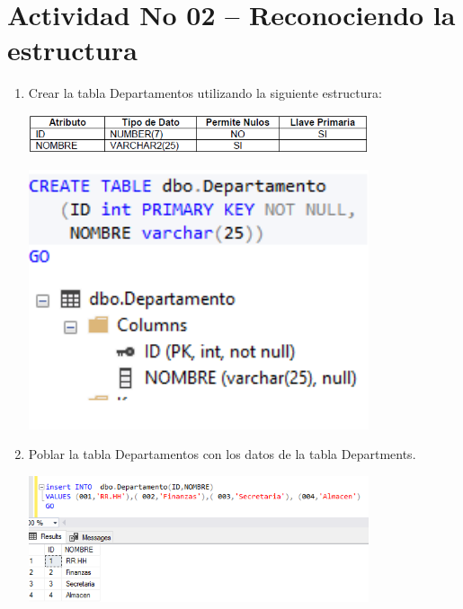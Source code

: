 \section{Actividad No 02 – Reconociendo la estructura} 

\begin{enumerate}[1.]
	\item Crear la tabla Departamentos utilizando la siguiente estructura:
	\\
		\begin{center}
		\includegraphics[width=10cm]{./Imagenes/enun1} 
		\end{center}
	
		\begin{center}
		\includegraphics[width=10cm]{./Imagenes/eje1} 
		\end{center}
	
	\item Poblar la tabla Departamentos con los datos de la tabla Departments.
	\\
	\begin{center}
	\includegraphics[width=10cm]{./Imagenes/eje2} 
	\end{center}
	

\end{enumerate}
